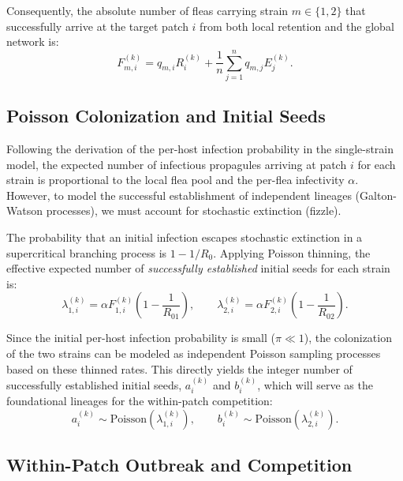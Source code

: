\documentclass[11pt,a4paper]{article}
\begin{document}
Consequently, the absolute number of fleas carrying strain $m \in \{1, 2\}$ that successfully arrive at the target patch $i$ from both local retention and the global network is:
\begin{equation}
F_{m,i}^{(k)} = q_{m,i} R_i^{(k)} + \frac{1}{n}\sum_{j=1}^n q_{m,j} E_j^{(k)}.
\end{equation}

\subsection{Poisson Colonization and Initial Seeds}

Following the derivation of the per-host infection probability in the single-strain model, the expected number of infectious propagules arriving at patch $i$ for each strain is proportional to the local flea pool and the per-flea infectivity $\alpha$. However, to model the successful establishment of independent lineages (Galton-Watson processes), we must account for stochastic extinction (fizzle). 

The probability that an initial infection escapes stochastic extinction in a supercritical branching process is $1 - 1/R_0$. Applying Poisson thinning, the effective expected number of \emph{successfully established} initial seeds for each strain is:
\begin{equation}
\lambda_{1,i}^{(k)} = \alpha F_{1,i}^{(k)} \left(1 - \frac{1}{R_{01}}\right), \qquad \lambda_{2,i}^{(k)} = \alpha F_{2,i}^{(k)} \left(1 - \frac{1}{R_{02}}\right).
\end{equation}

Since the initial per-host infection probability is small ($\pi \ll 1$), the colonization of the two strains can be modeled as independent Poisson sampling processes based on these thinned rates. This directly yields the integer number of successfully established initial seeds, $a_i^{(k)}$ and $b_i^{(k)}$, which will serve as the foundational lineages for the within-patch competition:
\begin{equation}
a_i^{(k)} \sim \mathrm{Poisson}\!\left(\lambda_{1,i}^{(k)}\right), \qquad b_i^{(k)} \sim \mathrm{Poisson}\!\left(\lambda_{2,i}^{(k)}\right).
\end{equation}

\subsection{Within-Patch Outbreak and Competition}
\end{document}
